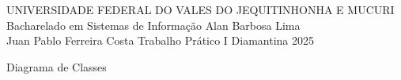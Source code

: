 \documentclass[12pt,a4paper]{article}
\begin{document}
\jaxkfrontcover
{UNIVERSIDADE FEDERAL DO VALES DO JEQUITINHONHA E MUCURI}
{Bacharelado em Sistemas de Informação}
{Alan Barbosa Lima\\Juan Pablo Ferreira Costa}
{Trabalho Prático I}
{Diamantina}
{2025}

\jaxkstartbody

\begin{jaxksection}{Diagrama de Classes}

\begin{center}
\end{center}

\end{jaxksection}
\end{document}
